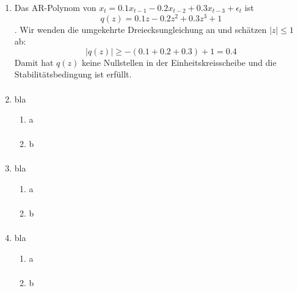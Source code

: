 \documentclass[a4paper,11pt,notitlepage,fullpage]{article}
\begin{document}
\begin{enumerate}
\item Das AR-Polynom von $x_t = 0.1 x_{t-1} - 0.2 x_{t-2} + 0.3 x_{t-3} + \epsilon_t$ ist $$q(z) = 0.1 z - 0.2 z^2 + 0.3 z^3 + 1$$.
Wir wenden die umgekehrte Dreiecksungleichung an und schätzen $|z| \leq 1$ ab:
$$|q(z)| \geq -(0.1 + 0.2 + 0.3) + 1 = 0.4$$
Damit hat $q(z)$ keine Nullstellen in der Einheitskreisscheibe und die Stabilitätsbedingung ist erfüllt.
\begin{align*}
\end{align*}


\item bla
\begin{enumerate}
\item a
\begin{align*}
\end{align*}

\item b
\begin{align*}
\end{align*}
\end{enumerate}

\item bla
\begin{enumerate}
\item a
\begin{align*}
\end{align*}

\item b
\begin{align*}
\end{align*}
\end{enumerate}

\item bla
\begin{enumerate}
\item a
\begin{align*}
\end{align*}

\item b
\begin{align*}
\end{align*}
\end{enumerate}

\end{enumerate}
\end{document}
